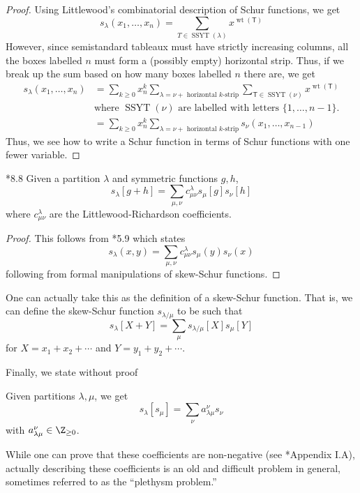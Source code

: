 \documentclass[11pt,leqno,oneside]{amsart}
\numberwithin{thm}{section}
\newcommand{\T}{\mathsf{T}}
\newcommand{\wt}{\operatorname{wt}}
\newcommand{\SSYT}{\operatorname{SSYT}}
\begin{document}
\begin{proof}
  Using Littlewood's combinatorial description of Schur functions, we
  get \[
    s_\lambda(x_1,\ldots,x_n) = \sum_{T \in \SSYT(\lambda)}
    x^{\wt(\T)}
  \]
  However, since semistandard tableaux must have strictly increasing
  columns, all the boxes labelled \(n\) must form a (possibly empty)
  horizontal strip. Thus, if we break up the sum based on how many
  boxes labelled \(n\) there are, we get
  \begin{align*}
    s_\lambda(x_1, \ldots, x_n)
    & = \sum_{k \geq 0} x_n^k \sum_{\lambda
      = \nu + \text{ horizontal }k\text{-strip}} \sum_{\T \in
      \SSYT(\nu)} x^{\wt(\T)} \\
    & \text{where } \SSYT(\nu) \text{ are labelled with letters
                                } \{1,\ldots,n-1\}. 
 \\
    & = \sum_{k \geq 0} x_n^k \sum_{\lambda
      = \nu + \text{ horizontal }k\text{-strip}} s_\nu(x_1,\ldots,x_{n-1})
  \end{align*}
  Thus, we see how to write a Schur function in terms of Schur
  functions with one fewer variable.
\end{proof}
\begin{prop}
  \cite{macdonald}*{8.8} Given a partition \(\lambda\) and symmetric functions \(g,h\), \[
    s_\lambda[g+h] = \sum_{\mu,\nu} c_{\mu \nu}^{\lambda} s_\mu[g] s_\nu[h]
  \]
  where \(c_{\mu \nu}^{\lambda}\) are the Littlewood-Richardson
  coefficients. 
\end{prop}
\begin{proof}
  This follows from \cite{macdonald}*{5.9} which states \[
    s_\lambda(x,y) = \sum_{\mu,\nu} c_{\mu \nu}^{\lambda} s_\mu(y) s_\nu(x)
  \]
  following from formal manipulations of skew-Schur functions.
\end{proof}
\begin{rmk}
  One can actually take this as the definition of a skew-Schur
  function. That is, we can define the skew-Schur function
  \(s_{\lambda/\mu}\) to be such that \[
    s_\lambda[X+Y] = \sum_\mu s_{\lambda/\mu}[X] s_\mu[Y]
  \]
  for \(X = x_1 + x_2 + \cdots\) and \(Y = y_1 + y_2 + \cdots\).
\end{rmk}
Finally, we state without proof
\begin{thm}
  Given partitions \(\lambda,\mu\), we get \[
    s_\lambda[s_\mu] = \sum_{\nu} a_{\lambda \mu}^{\nu} s_\nu
  \]
  with \(a_{\lambda \mu}^{\nu} \in \Z_{\geq 0}\).
\end{thm}
\begin{rmk}
  While one can prove that these coefficients are non-negative (see
  \cite{macdonald}*{Appendix I.A}), actually describing these
  coefficients is an old and difficult problem in general, sometimes
  referred to as the ``plethysm problem.''
\end{rmk}
\end{document}
